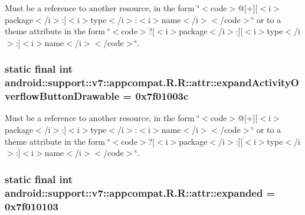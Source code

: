 Must be a reference to another resource, in the form \char`\"{}$<$code$>$@\mbox{[}+\mbox{]}\mbox{[}$<$i$>$package$<$/i$>$:\mbox{]}$<$i$>$type$<$/i$>$:$<$i$>$name$<$/i$>$$<$/code$>$\char`\"{} or to a theme attribute in the form \char`\"{}$<$code$>$?\mbox{[}$<$i$>$package$<$/i$>$:\mbox{]}\mbox{[}$<$i$>$type$<$/i$>$:\mbox{]}$<$i$>$name$<$/i$>$$<$/code$>$\char`\"{}. \hypertarget{classandroid_1_1support_1_1v7_1_1appcompat_1_1_r_1_1attr_1025bf90b03398fd3b4aac2f7d219458}{
\subsubsection[{expandActivityOverflowButtonDrawable}]{\setlength{\rightskip}{0pt plus 5cm}static final int android::support::v7::appcompat.R.R::attr::expandActivityOverflowButtonDrawable = 0x7f01003c}}
\label{classandroid_1_1support_1_1v7_1_1appcompat_1_1_r_1_1attr_1025bf90b03398fd3b4aac2f7d219458}


Must be a reference to another resource, in the form \char`\"{}$<$code$>$@\mbox{[}+\mbox{]}\mbox{[}$<$i$>$package$<$/i$>$:\mbox{]}$<$i$>$type$<$/i$>$:$<$i$>$name$<$/i$>$$<$/code$>$\char`\"{} or to a theme attribute in the form \char`\"{}$<$code$>$?\mbox{[}$<$i$>$package$<$/i$>$:\mbox{]}\mbox{[}$<$i$>$type$<$/i$>$:\mbox{]}$<$i$>$name$<$/i$>$$<$/code$>$\char`\"{}. \hypertarget{classandroid_1_1support_1_1v7_1_1appcompat_1_1_r_1_1attr_4b5163ce9ec708e3c7b8a21e8e239d5c}{
\subsubsection[{expanded}]{\setlength{\rightskip}{0pt plus 5cm}static final int android::support::v7::appcompat.R.R::attr::expanded = 0x7f010103}}
\label{classandroid_1_1support_1_1v7_1_1appcompat_1_1_r_1_1attr_4b5163ce9ec708e3c7b8a21e8e239d5c}


